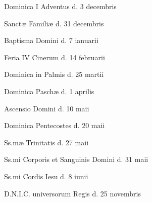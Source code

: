 \newpage
\thispagestyle{empty}
\medskip
\fontsize{12}{12}\selectfont
\setlength{\parskip}{0.1cm}
Dominica I Adventus \dotfill d. 3 decembris\par
Sanctæ Familiæ \dotfill d. 31 decembris\par
Baptisma Domini \dotfill d. 7 ianuarii\par
Feria IV Cinerum \dotfill d. 14 februarii\par
Dominica in Palmis \dotfill d. 25 martii\par
Dominica Paschæ \dotfill d. 1 aprilis\par
Ascensio Domini \dotfill d. 10 maii\par
Dominica Pentecostes \dotfill d. 20 maii\par
Ss.mæ Trinitatis \dotfill d. 27 maii\par
Ss.mi Corporis et Sanguinis Domini \dotfill d. 31 maii\par
Ss.mi Cordis Iesu \dotfill d. 8 iunii\par
D.N.I.C. universorum Regis \dotfill d. 25 novembris\par
\vspace{1cm}
\newpage
\thispagestyle{empty}
\setlength{\tabcolsep}{0cm}
